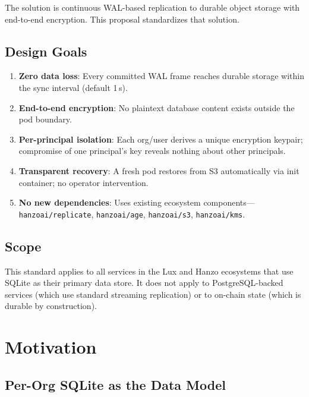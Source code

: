 \documentclass[11pt,a4paper]{article}
\begin{document}
The solution is continuous WAL-based replication to durable object
storage with end-to-end encryption. This proposal standardizes that
solution.

\subsection{Design Goals}

\begin{enumerate}[nosep]
  \item \textbf{Zero data loss}: Every committed WAL frame reaches
    durable storage within the sync interval (default 1\,s).
  \item \textbf{End-to-end encryption}: No plaintext database content
    exists outside the pod boundary.
  \item \textbf{Per-principal isolation}: Each org/user derives a unique
    encryption keypair; compromise of one principal's key reveals
    nothing about other principals.
  \item \textbf{Transparent recovery}: A fresh pod restores from S3
    automatically via init container; no operator intervention.
  \item \textbf{No new dependencies}: Uses existing ecosystem
    components---\texttt{hanzoai/replicate}, \texttt{hanzoai/age},
    \texttt{hanzoai/s3}, \texttt{hanzoai/kms}.
\end{enumerate}

\subsection{Scope}

This standard applies to all services in the Lux and Hanzo ecosystems
that use SQLite as their primary data store. It does not apply to
PostgreSQL-backed services (which use standard streaming replication)
or to on-chain state (which is durable by construction).

\section{Motivation}\label{sec:motivation}

\subsection{Per-Org SQLite as the Data Model}
\end{document}
